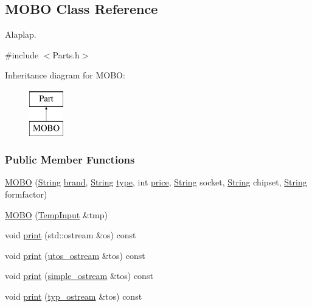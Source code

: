 \subsection{M\+O\+BO Class Reference}
\label{class_m_o_b_o}


Alaplap.  




{\ttfamily \#include $<$Parts.\+h$>$}

Inheritance diagram for M\+O\+BO\+:\begin{figure}[H]
\begin{center}
\leavevmode
\includegraphics[height=2.000000cm]{class_m_o_b_o}
\end{center}
\end{figure}
\subsubsection*{Public Member Functions}
\begin{DoxyCompactItemize}
\item 
\mbox{\hyperlink{class_m_o_b_o_a3185de871765391ae3a0ffe4b0af7e5b}{M\+O\+BO}} (\mbox{\hyperlink{class_string}{String}} \mbox{\hyperlink{class_part_ae06f2fdeb7fbbdb229a7aca151f3e341}{brand}}, \mbox{\hyperlink{class_string}{String}} \mbox{\hyperlink{class_part_a101dbcc5c4b21564df7414c7eb0eae88}{type}}, int \mbox{\hyperlink{class_part_a8e71223aed1da95a974f33d8d6c91bb1}{price}}, \mbox{\hyperlink{class_string}{String}} socket, \mbox{\hyperlink{class_string}{String}} chipset, \mbox{\hyperlink{class_string}{String}} formfactor)
\item 
\mbox{\hyperlink{class_m_o_b_o_a544dc57e821c152a922a3d8bc9913500}{M\+O\+BO}} (\mbox{\hyperlink{struct_temp_input}{Temp\+Input}} \&tmp)
\item 
void \mbox{\hyperlink{class_m_o_b_o_a3241f425030e01d5b7a192c23af2dbda}{print}} (std\+::ostream \&os) const
\item 
void \mbox{\hyperlink{class_m_o_b_o_a4c78cec3a2a3e4d4480855622f50bd06}{print}} (\mbox{\hyperlink{structutos__ostream}{utos\+\_\+ostream}} \&tos) const
\item 
void \mbox{\hyperlink{class_m_o_b_o_a01fed4470cbf8c58f86426aa8f52b225}{print}} (\mbox{\hyperlink{structsimple__ostream}{simple\+\_\+ostream}} \&tos) const
\item 
void \mbox{\hyperlink{class_m_o_b_o_a3dd7e36103afbb4b6c09b65975317b9c}{print}} (\mbox{\hyperlink{structtyp__ostream}{typ\+\_\+ostream}} \&tos) const
\end{DoxyCompactItemize}
